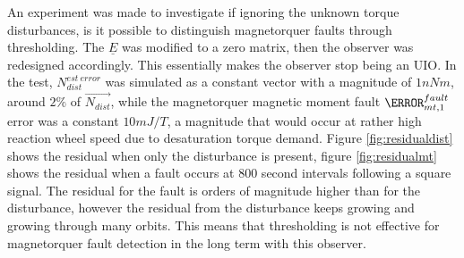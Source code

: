 An experiment was made to investigate if ignoring the unknown torque disturbances, is it possible to distinguish magnetorquer faults through thresholding. The $\underline{E}$ was modified to a zero matrix, then the observer was redesigned accordingly. This essentially makes the observer stop being an UIO. In the test, $N^{est \ error}_{dist}$ was simulated as a constant vector with a magnitude of $1 nNm$, around $2\%$ of $\vec{N_{dist} }$, while the magnetorquer magnetic moment fault $\m^{fault}_{mt,1}$ error was a constant $10 mJ/T$, a magnitude that would occur at rather high reaction wheel speed due to desaturation torque demand. Figure \ref{fig:residualdist} shows the residual when only the disturbance is present, figure \ref{fig:residualmt} shows the residual when a fault occurs at 800 second intervals following a square signal. The residual for the fault is orders of magnitude higher than for the disturbance, however the residual from the disturbance keeps growing and growing through many orbits. This means that thresholding is not effective for magnetorquer fault detection in the long term with this observer.




